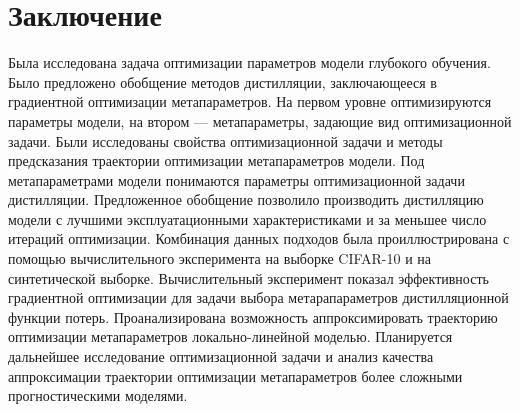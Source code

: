 \documentclass[12pt, twoside]{article}
\begin{document}

\section{Заключение}

Была исследована задача оптимизации параметров модели глубокого обучения. Было предложено обобщение методов дистилляции, заключающееся в градиентной оптимизации метапараметров. На первом уровне оптимизируются параметры модели, на втором --- метапараметры, задающие вид оптимизационной задачи. Были исследованы свойства оптимизационной задачи и методы предсказания траектории оптимизации метапараметров модели. Под метапараметрами модели понимаются параметры оптимизационной задачи дистилляции. Предложенное обобщение позволило производить дистилляцию модели с лучшими эксплуатационными характеристиками и за меньшее число итераций оптимизации. Комбинация данных подходов была проиллюстрирована с помощью вычислительного эксперимента на выборке CIFAR-10 и на синтетической выборке. Вычислительный эксперимент показал эффективность градиентной оптимизации для задачи выбора метарапараметров дистилляционной функции потерь. Проанализирована возможность аппроксимировать траекторию оптимизации метапараметров локально-линейной моделью. Планируется дальнейшее исследование оптимизационной задачи и анализ качества аппроксимации траектории оптимизации метапараметров более сложными прогностическими моделями.







\maketitleSecondary
\English



\end{document}
